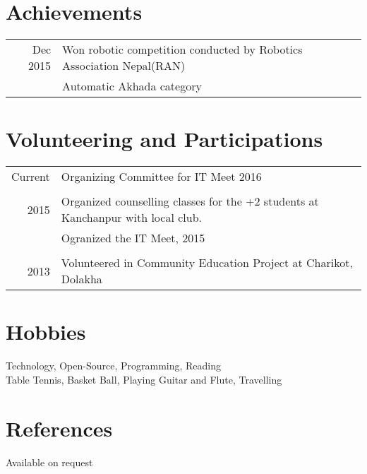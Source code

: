 \documentclass[letter]{res}
\begin{document}
\begin{resume}
\section{Achievements}
\begin{tabular}{rl}	
 Dec 2015  & Won robotic competition conducted by Robotics Association Nepal(RAN) \\
 & Automatic Akhada category\\
\end{tabular}


\section{Volunteering and Participations}
\begin{tabular}{rl}	
 Current & Organizing Committee for IT Meet 2016\\\\
 \textsc{2015} & Organized counselling classes for the +2 students at Kanchanpur with local club.\\
 &Ogranized the IT Meet, 2015\\\\
 \textsc{2013} & Volunteered in Community Education Project at Charikot, Dolakha
\end{tabular}
 
\section{Hobbies} 
Technology, Open-Source, Programming, Reading\\ 
Table Tennis, Basket Ball, Playing Guitar and Flute, Travelling
 
\section{References}
Available on request
\end{resume}
\end{document}

